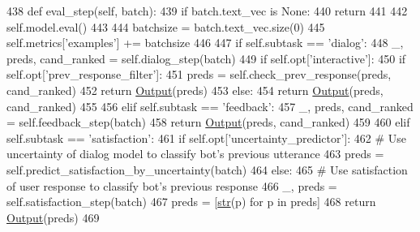 \begin{DoxyCode}
438     \textcolor{keyword}{def }eval\_step(self, batch):
439         \textcolor{keywordflow}{if} batch.text\_vec \textcolor{keywordflow}{is} \textcolor{keywordtype}{None}:
440             \textcolor{keywordflow}{return}
441 
442         self.model.eval()
443 
444         batchsize = batch.text\_vec.size(0)
445         self.metrics[\textcolor{stringliteral}{'examples'}] += batchsize
446 
447         \textcolor{keywordflow}{if} self.subtask == \textcolor{stringliteral}{'dialog'}:
448             \_, preds, cand\_ranked = self.dialog\_step(batch)
449             \textcolor{keywordflow}{if} self.opt[\textcolor{stringliteral}{'interactive'}]:
450                 \textcolor{keywordflow}{if} self.opt[\textcolor{stringliteral}{'prev\_response\_filter'}]:
451                     preds = self.check\_prev\_response(preds, cand\_ranked)
452                 \textcolor{keywordflow}{return} \hyperlink{namespaceparlai_1_1agents_1_1legacy__agents_1_1seq2seq_1_1torch__agent__v1_a2689006ea97d09413fb242f984bd8016}{Output}(preds)
453             \textcolor{keywordflow}{else}:
454                 \textcolor{keywordflow}{return} \hyperlink{namespaceparlai_1_1agents_1_1legacy__agents_1_1seq2seq_1_1torch__agent__v1_a2689006ea97d09413fb242f984bd8016}{Output}(preds, cand\_ranked)
455 
456         \textcolor{keywordflow}{elif} self.subtask == \textcolor{stringliteral}{'feedback'}:
457             \_, preds, cand\_ranked = self.feedback\_step(batch)
458             \textcolor{keywordflow}{return} \hyperlink{namespaceparlai_1_1agents_1_1legacy__agents_1_1seq2seq_1_1torch__agent__v1_a2689006ea97d09413fb242f984bd8016}{Output}(preds, cand\_ranked)
459 
460         \textcolor{keywordflow}{elif} self.subtask == \textcolor{stringliteral}{'satisfaction'}:
461             \textcolor{keywordflow}{if} self.opt[\textcolor{stringliteral}{'uncertainty\_predictor'}]:
462                 \textcolor{comment}{# Use uncertainty of dialog model to classify bot's previous utterance}
463                 preds = self.predict\_satisfaction\_by\_uncertainty(batch)
464             \textcolor{keywordflow}{else}:
465                 \textcolor{comment}{# Use satisfaction of user response to classify bot's previous response}
466                 \_, preds = self.satisfaction\_step(batch)
467             preds = [\hyperlink{namespacegenerate__task__READMEs_a5b88452ffb87b78c8c85ececebafc09f}{str}(p) \textcolor{keywordflow}{for} p \textcolor{keywordflow}{in} preds]
468             \textcolor{keywordflow}{return} \hyperlink{namespaceparlai_1_1agents_1_1legacy__agents_1_1seq2seq_1_1torch__agent__v1_a2689006ea97d09413fb242f984bd8016}{Output}(preds)
469 
\end{DoxyCode}
